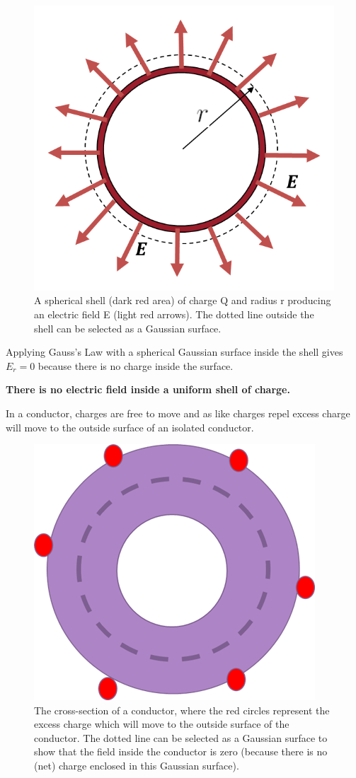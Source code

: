\documentclass[
]{book}
\numberwithin{equation}{section}
\begin{document}
\begin{figure}

{\centering \includegraphics[width=0.7\linewidth]{Figures/GaussOutsideShell} 

}

\caption{A spherical shell (dark red area) of charge Q and radius r producing an electric field E (light red arrows). The dotted line outside the shell can be selected as a Gaussian surface. }\label{fig:GaussOutsideShell}
\end{figure}

Applying Gauss's Law with a spherical Gaussian surface inside the shell
gives \(E_r = 0\) because there is no charge inside the surface.

\textbf{There is no electric field inside a uniform shell of charge.}

In a conductor, charges are free to move and as like charges repel
excess charge will move to the outside surface of an isolated conductor.

\begin{figure}

{\centering \includegraphics[width=0.7\linewidth]{Figures/GaussInsideShell} 

}

\caption{The cross-section of a conductor, where the red circles represent the excess charge which will move to the outside surface of the conductor. The dotted line can be selected as a Gaussian surface to show that the field inside the conductor is zero (because there is no (net) charge enclosed in this Gaussian surface).}\label{fig:GaussInsideShell}
\end{figure}
\end{document}
